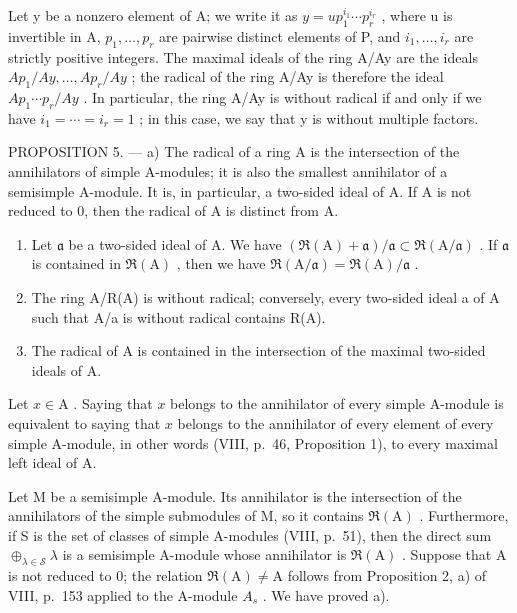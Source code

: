 Let y be a nonzero element of A; we write it as \(y = up_{1}^{i_{1}} \cdots p_{r}^{i_{r}}\) , where u is invertible in A, \(p_{1}, \ldots, p_{r}\) are pairwise distinct elements of P, and \(i_{1}, \ldots, i_{r}\) are strictly positive integers. The maximal ideals of the ring A/Ay are the ideals \(Ap_{1}/Ay, \ldots, Ap_{r}/Ay\) ; the radical of the ring A/Ay is therefore the ideal \(Ap_{1} \cdots p_{r}/Ay\) . In particular, the ring A/Ay is without radical if and only if we have \(i_{1} = \cdots = i_{r} = 1\) ; in this case, we say that y is without multiple factors.

PROPOSITION 5. --- a) The radical of a ring A is the intersection of the annihilators of simple A-modules; it is also the smallest annihilator of a semisimple A-module. It is, in particular, a two-sided ideal of A. If A is not reduced to 0, then the radical of A is distinct from A.

\begin{enumerate}
\def\labelenumi{\alph{enumi})}
\setcounter{enumi}{1}
\item
  Let \(\mathfrak{a}\) be a two-sided ideal of A. We have \((\Re (\mathrm{A}) + \mathfrak{a}) / \mathfrak{a} \subset \Re (\mathrm{A} / \mathfrak{a})\) . If \(\mathfrak{a}\) is contained in \(\Re (\mathrm{A})\) , then we have \(\Re (\mathrm{A} / \mathfrak{a}) = \Re (\mathrm{A}) / \mathfrak{a}\) .
\item
  The ring A/R(A) is without radical; conversely, every two-sided ideal a of A such that A/a is without radical contains R(A).
\item
  The radical of A is contained in the intersection of the maximal two-sided ideals of A.
\end{enumerate}

Let \(x \in \mathrm{A}\) . Saying that \(x\) belongs to the annihilator of every simple A-module is equivalent to saying that \(x\) belongs to the annihilator of every element of every simple A-module, in other words (VIII, p.~46, Proposition 1), to every maximal left ideal of A.

Let M be a semisimple A-module. Its annihilator is the intersection of the annihilators of the simple submodules of M, so it contains \(\Re(\mathrm{A})\) . Furthermore, if S is the set of classes of simple A-modules (VIII, p.~51), then the direct sum \(\oplus_{\lambda\in\mathcal{S}}\lambda\) is a semisimple A-module whose annihilator is \(\Re(\mathrm{A})\) . Suppose that A is not reduced to 0; the relation \(\Re(\mathrm{A})\neq\mathrm{A}\) follows from Proposition 2, a) of VIII, p.~153 applied to the A-module \(A_{s}\) . We have proved a).

